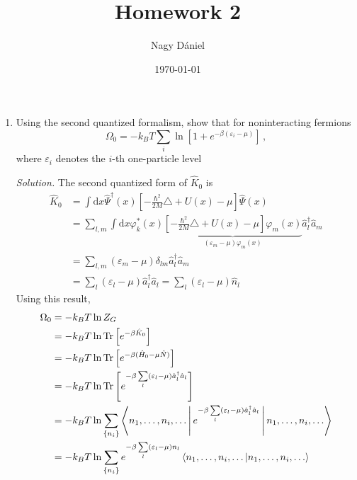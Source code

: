 \documentclass[11pt, a4paper]{article}
\title{Homework 2}
\author{Nagy Dániel}
\date{\today}
\newcommand{\dd}{\mathrm{d}}
\newcommand{\Tr}[1]{\mathrm{Tr}\left[#1\right]}
\begin{document}
\maketitle
\newpage

\begin{enumerate}
    \item Using the second quantized formalism, show that for noninteracting fermions
    \begin{equation*}
        \Omega_0 = -k_BT\sum\limits_i \ln \left[1 + e^{-\beta(\varepsilon_i - \mu)}\right]\,,
    \end{equation*}
    where $\varepsilon_i$ denotes the $i$-th one-particle level
    \par\textit{Solution.}
    The second quantized form of $\hat K_0$ is 
    \begin{align*}
        \hat K_0 &= \int \dd x \hat\Psi^{\dagger}(x)\left[-\frac{\hbar^2}{2M}\triangle + U(x)
        -\mu\right]\hat\Psi(x) \\
        & = \sum\limits_{l,m} \int \dd x  \varphi_k^*(x)\underbrace{\left[-\frac{\hbar^2}{2M}\triangle + U(x)
        -\mu\right]\varphi_m(x)}_{(\varepsilon_m - \mu)\varphi_m(x)} \hat a_l^{\dagger}\hat a_m \\
        & = \sum\limits_{l,m}(\varepsilon_m - \mu)\delta_{lm} \hat a_l^{\dagger}\hat a_m \\
        & = \sum\limits_l (\varepsilon_l-\mu) \hat a_l^{\dagger}\hat a_l 
        = \sum\limits_l (\varepsilon_l-\mu) \hat n_l
    \end{align*}
    Using this result, 
    \begin{align*}
        \Omega_0 &= -k_BT\ln Z_G\\
        &= -k_BT \ln \Tr{e^{-\beta \hat K_0}}\\
        &= -k_BT \ln \Tr{e^{-\beta (\hat H_0 - \mu\hat N)}}\\
        &= -k_BT \ln \Tr{e^{-\beta \sum\limits_l(\varepsilon_l - \mu)\hat a_l^{\dagger}\hat a_l}}\\
        &= -k_BT \ln \sum\limits_{\{n_i\}}\Braket{n_1, \dots, n_i, \dots | e^{-\beta \sum\limits_l(\varepsilon_l-\mu) \hat a_l^{\dagger} \hat a_l}| n_1, \dots, n_i, \dots }\\
        &= -k_BT \ln \sum\limits_{\{n_i\}} e^{-\beta \sum\limits_l(\varepsilon_l-\mu) n_l} \braket{n_1, \dots, n_i, \dots | n_1, \dots, n_i, \dots }\\

\end{align*}
\end{enumerate}
\end{document}
